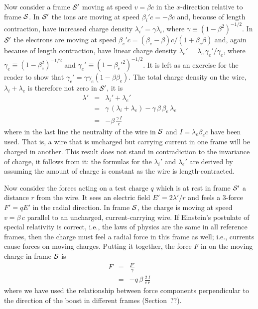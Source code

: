 Now consider a frame $\cal S'$ moving at speed $v=\beta c$ in the
$x$-direction relative to frame $\cal S$.  In $\cal S'$ the ions are
moving at speed $\beta_i'c=-\beta c$ and, because of length
contraction, have increased charge density
$\lambda_i'=\gamma\lambda_i$, where $\gamma\equiv (1-\beta^2)^{-1/2}$.
In $\cal S'$ the electrons are moving at speed
$\beta_e'c=(\beta_e-\beta)c/(1+\beta_e\beta)$ and, again because of
length contraction, have linear charge density
$\lambda_e'=\lambda_e\,\gamma_e'/\gamma_e$, where $\gamma_e\equiv
(1-\beta_e^2)^{-1/2}$ and $\gamma_e'\equiv (1-\beta_e'^2)^{-1/2}$.  It
is left as an exercise for the reader to show that
$\gamma_e'=\gamma\gamma_e(1-\beta\beta_e)$.  The total charge density
on the wire, $\lambda_i+\lambda_e$ is therefore not zero in
$\cal S'$, it is
\begin{eqnarray}
\lambda' & = & \lambda_i'+\lambda_e' \nonumber \\
 & = & \gamma\,(\lambda_i+\lambda_e)
       - \gamma\,\beta\,\beta_e\,\lambda_e \nonumber \\
 & = & - \beta\,\frac{\gamma\,I}{c}
\end{eqnarray}
where in the last line the neutrality of the wire in $\cal S$ and
$I=\lambda_e\beta_ec$ have been used.  That is, a wire that is
uncharged but carrying current in one frame will be charged in
another.  This result does not stand in contradiction to the
invariance of charge, it follows from it: the formulas for the
$\lambda_i'$ and $\lambda_e'$ are derived by assuming the amount of
charge is constant as the wire is length-contracted.

Now consider the forces acting on a test charge $q$ which is at rest
in frame $\cal S'$ a distance $r$ from the wire.  It sees an electric
field $E'=2\lambda'/r$ and feels a 3-force $F'=qE'$ in the radial
direction.  In frame $\cal S$, the charge is moving at speed
$v=\beta\,c$ parallel to an uncharged, current-carrying wire.  If
Einstein's postulate of special relativity is correct, i.e., the laws
of physics are the same in all reference frames, then the charge must
feel a radial force in this frame as well; i.e., currents cause forces
on moving charges.  Putting it together, the force $F$ in on the
moving charge in frame $\cal S$ is
\begin{eqnarray}
F & = & \frac{F'}{\gamma} \nonumber \\
  & = & - q\,\beta\,\frac{2\,I}{c\,r}
\end{eqnarray}
where we have used the relationship between force components
perpendicular to the direction of the boost in different frames
(Section~??).

